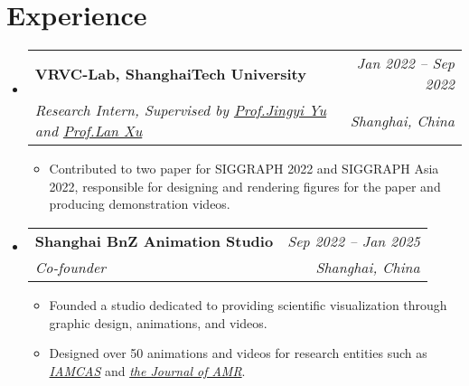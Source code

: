 \documentclass[letterpaper,11pt]{article}
\makeatletter
\newcommand{\resumeItem}[1]{
  \item\small{
    {#1 \vspace{-2pt}}
  }
}
\newcommand{\resumeSubheading}[4]{
  \item
    \begin{tabular*}{1.0\textwidth}[t]{l@{\extracolsep{\fill}}r}
      \textbf{#1} & \textit{\small #2} \\
      \textit{\small#3} & \textit{\small #4} \\
    \end{tabular*}\vspace{-3pt}
}
\newcommand{\resumeSubHeadingListStart}{\begin{itemize}[leftmargin=0.0in, label={}]}
\newcommand{\resumeSubHeadingListEnd}{\end{itemize}}
\newcommand{\resumeItemListStart}{\begin{itemize}}
\newcommand{\resumeItemListEnd}{\end{itemize}\vspace{-5pt}}
\makeatother
\begin{document}
\section{Experience}
  \resumeSubHeadingListStart
    \resumeSubheading
      {VRVC-Lab, ShanghaiTech University}{Jan 2022 -- Sep 2022}
      {Research Intern, Supervised by \href{http://www.yu-jingyi.com/}{Prof.Jingyi Yu} and \href{https://www.xu-lan.com/}{Prof.Lan Xu}}{Shanghai, China}
      \resumeItemListStart
        \resumeItem{Contributed to two paper for SIGGRAPH 2022 and SIGGRAPH Asia 2022, responsible for designing and rendering figures for the paper and producing demonstration videos.}
      \resumeItemListEnd


    \resumeSubheading
      {Shanghai BnZ Animation Studio}{Sep 2022 -- Jan 2025}
      {Co-founder}{Shanghai, China}
      \resumeItemListStart
        \resumeItem{Founded a studio dedicated to providing scientific visualization through graphic design, animations, and videos.}
        \resumeItem{Designed over 50 animations and videos for research entities such as \href{https://www.microsate.com/}{\textit{IAMCAS}} and \href{https://pubs.acs.org/journal/amrcda}{\textit{the Journal of AMR}}.}
  \resumeItemListEnd

  \resumeSubHeadingListEnd
\vspace{-6pt}

                
\end{document}
